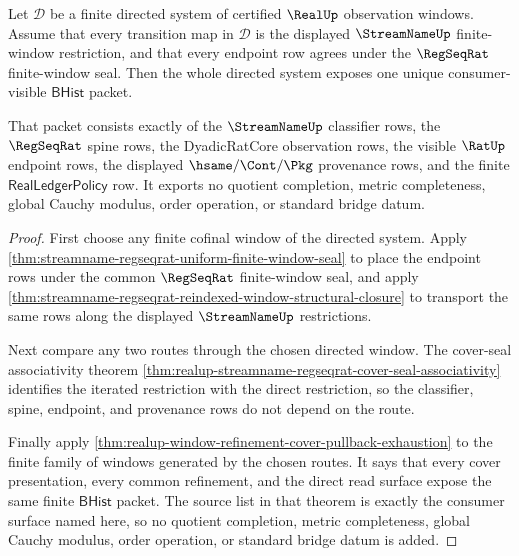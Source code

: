 \begin{theorem}
\label{thm:realup-streamname-regseqrat-directed-window-consumer-surface}
Let $\mathcal{D}$ be a finite directed system of certified $\RealUp$
observation windows. Assume that every transition map in $\mathcal{D}$ is the
displayed $\StreamNameUp$ finite-window restriction, and that every endpoint
row agrees under the $\RegSeqRat$ finite-window seal. Then the whole directed
system exposes one unique consumer-visible $\mathsf{BHist}$ packet.

That packet consists exactly of the $\StreamNameUp$ classifier rows, the
$\RegSeqRat$ spine rows, the DyadicRatCore observation rows, the visible
$\RatUp$ endpoint rows, the displayed $\hsame/\Cont/\Pkg$ provenance rows, and
the finite $\mathsf{RealLedgerPolicy}$ row. It exports no quotient completion,
metric completeness, global Cauchy modulus, order operation, or standard bridge
datum.
\end{theorem}
\begin{proof}
First choose any finite cofinal window of the directed system. Apply
\autoref{thm:streamname-regseqrat-uniform-finite-window-seal} to place the
endpoint rows under the common $\RegSeqRat$ finite-window seal, and apply
\autoref{thm:streamname-regseqrat-reindexed-window-structural-closure} to
transport the same rows along the displayed $\StreamNameUp$ restrictions.

Next compare any two routes through the chosen directed window. The cover-seal
associativity theorem
\autoref{thm:realup-streamname-regseqrat-cover-seal-associativity} identifies
the iterated restriction with the direct restriction, so the classifier,
spine, endpoint, and provenance rows do not depend on the route.

Finally apply
\autoref{thm:realup-window-refinement-cover-pullback-exhaustion} to the finite
family of windows generated by the chosen routes. It says that every cover
presentation, every common refinement, and the direct read surface expose the
same finite $\mathsf{BHist}$ packet. The source list in that theorem is
exactly the consumer surface named here, so no quotient completion, metric
completeness, global Cauchy modulus, order operation, or standard bridge datum
is added.
\end{proof}
